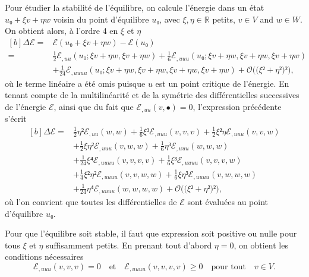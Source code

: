 \documentclass[12pt, final]{amsart}
\newcommand{\reals}{\mathbb{R}}
\begin{document}
Pour étudier la stabilité de l'équilibre, on calcule l'énergie dans un état
\(u₀+ξ v+η w\) voisin du point d'équilibre \(u₀\), avec
\(ξ, η∈\reals\) \guillemotleft{}petits\guillemotright{}, \(v∈ V\) and
\(w∈ W\). On obtient alors, à l'ordre 4 en \(ξ\) et \(η\)
\begin{equation}
  \begin{aligned}[b]
    Δℰ ={}&
    ℰ(u₀+ξ v+η w)-ℰ(u₀)\\
    ={}&\tfrac12ℰ_{,uu}(u₀;ξ v+η w, ξ v+η w)
    +\tfrac16ℰ_{,uuu}(u₀;ξ v+η w, ξ v+η w, ξ v+η w)\\
    &+\tfrac1{24}ℰ_{,uuuu}(u₀;ξ v+η w, ξ v+η w, ξ v+η w,
    ξ v+η w)+𝒪\bigl(\bigl(ξ²+η²\bigr)²\bigr),
  \end{aligned}
\end{equation}
où le terme linéaire a été omis puisque \(u\) est un point critique de
l'énergie. En tenant compte de la multilinéarité et de la symétrie des
différentielles successives de l'énergie \(ℰ\), ainsi que du fait que
\(ℰ_{,uu}(v, •)=0\), l'expression précédente s'écrit
\begin{equation}
  \begin{aligned}[b]
    Δℰ
    ={}&\tfrac12η²ℰ_{,uu}(w, w)
    +\tfrac16ξ³ℰ_{,uuu}(v, v, v)
    +\tfrac12ξ²ηℰ_{,uuu}(v, v, w)\\
    &+\tfrac12ξη²ℰ_{,uuu}(v, w, w)
    +\tfrac16η³ℰ_{,uuu}(w, w, w)\\
    &+\tfrac1{24}ξ⁴ℰ_{,uuuu}(v, v, v, v)
    +\tfrac16ξ³ℰ_{,uuuu}(v, v, v, w)\\
    &+\tfrac14ξ²η²ℰ_{,uuuu}(v, v, w, w)
    +\tfrac16ξη³ℰ_{,uuuu}(v, w, w, w)\\
    &+\tfrac1{24}η⁴ℰ_{,uuuu}(w, w, w, w)
    +𝒪\bigl(\bigl(ξ²+η²\bigr)²\bigr),
  \end{aligned}
\end{equation}
où l'on convient que toutes les différentielles de \(ℰ\) sont évaluées
au point d'équilibre \(u₀\).

Pour que l'équilibre soit stable, il faut que expression soit positive ou nulle
pour tous \(ξ\) et \(η\) suffisamment petits. En prenant tout d'abord
\(η=0\), on obtient les conditions nécessaires
\begin{equation}
  \label{eq:20211108164416}
  ℰ_{,uuu}(v, v, v)=0
  \quad\text{et}\quad
  ℰ_{,uuuu}(v, v, v, v)≥0
  \quad\text{pour tout}\quad v∈ V.
\end{equation}
\end{document}
